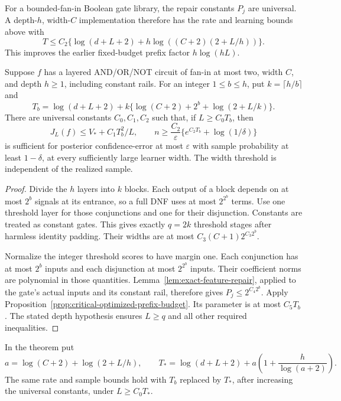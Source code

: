 For a bounded-fan-in Boolean gate library, the repair constants $P_j$
are universal. A depth-$h$, width-$C$ implementation therefore has
the rate and learning bounds above with
\[
 T\le C_2\{\log(d+L+2)+h\log((C+2)(2+L/h))\}.
\]
This improves the earlier fixed-budget prefix factor $h\log(hL)$.

\begin{theorem}
\label{thm:critical-boolean-blocking}
Suppose $f$ has a layered AND/OR/NOT circuit of fan-in at most two,
width $C$, and depth $h\ge1$, including constant rails. For an integer
$1\le b\le h$, put $k=\lceil h/b\rceil$ and
\[
 T_b=\log(d+L+2)+
       k\{\log(C+2)+2^b+\log(2+L/k)\}.
\]
There are universal constants $C_0,C_1,C_2$ such that, if
$L\ge C_0T_b$, then
\[
 J_L(f)\le V_*+C_1T_b^2/L,
 \qquad
 n\ge\frac{C_2}{\varepsilon}
            \{e^{C_2T_b}+\log(1/\delta)\}
\]
is sufficient for posterior confidence-error at most $\varepsilon$
with sample probability at least $1-\delta$, at every sufficiently
large learner width. The width threshold is independent of the
realized sample.
\end{theorem}

\begin{proof}
Divide the $h$ layers into $k$ blocks. Each output of a block depends
on at most $2^b$ signals at its entrance, so a full DNF uses at most
$2^{2^b}$ terms. Use one threshold layer for those conjunctions and
one for their disjunction. Constants are treated as constant gates.
This gives exactly $q=2k$ threshold stages after harmless identity
padding. Their widths are at most
$C_3(C+1)2^{C_3 2^b}$.

Normalize the integer threshold scores to have margin one.
Each conjunction has at most $2^b$ inputs and each disjunction at
most $2^{2^b}$ inputs. Their coefficient norms are polynomial in
those quantities. Lemma~\ref{lem:exact-feature-repair}, applied to
the gate's actual inputs and its constant rail, therefore gives
$P_j\le2^{C_4 2^b}$. Apply
Proposition~\ref{prop:critical-optimized-prefix-budget}.
Its parameter is at most $C_5T_b$. The stated depth hypothesis
ensures $L\ge q$ and all other required inequalities.
\end{proof}

\begin{corollary}
\label{cor:critical-adaptive-blocking}
In the theorem put
\[
 a=\log(C+2)+\log(2+L/h),\qquad
 T_* =\log(d+L+2)+a\left(1+\frac{h}{\log(a+2)}\right).
\]
The same rate and sample bounds hold with $T_b$ replaced by $T_*$,
after increasing the universal constants, under $L\ge C_0T_*$.
\end{corollary}

